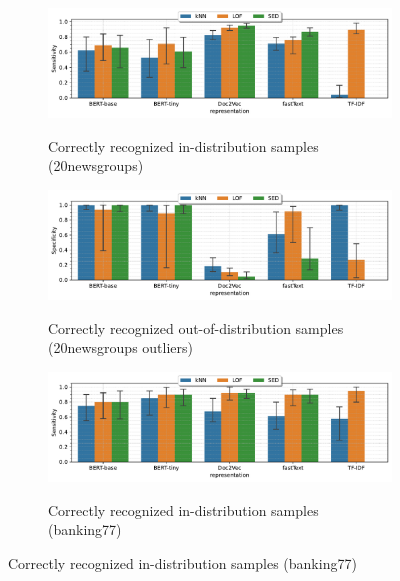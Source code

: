 \begin{figure}[t]
    \centering
    \begin{subfigure}[b]{0.9\textwidth}
        \centering
        \caption{\small Correctly recognized in-distribution samples (20newsgroups)}
        \includegraphics[width=\textwidth]{images/real-classification/barplot-20newsgroups-sens_95(representation,model)-representation_BERT-base,BERT-tiny,Doc2Vec,fastText,TF-IDF-class_0,16-data_outlier.pdf}
        \label{fig:20newsgroups-sensitivity}
    \end{subfigure}

    \vspace{-0.5em}
    \begin{subfigure}[b]{0.9\textwidth}
        \centering
        \caption{\small Correctly recognized out-of-distribution samples (20newsgroups outliers)}
        \includegraphics[width=\textwidth]{images/real-classification/barplot-20newsgroups-spec_95(representation,model)-representation_BERT-base,BERT-tiny,Doc2Vec,fastText,TF-IDF-class_0,16-data_outlier.pdf}
        \label{fig:20newsgroups-specificity}
    \end{subfigure}

    \begin{subfigure}[b]{0.9\textwidth}
        \centering
        \caption{\small Correctly recognized in-distribution samples (banking77)}
        \includegraphics[width=\textwidth]{images/real-classification/barplot-banking77-sens_95(representation,model)-representation_BERT-base,BERT-tiny,Doc2Vec,fastText,TF-IDF-class_0,61-data_outlier.pdf}
        \label{fig:banking77-sensitivity}
    \end{subfigure}


\end{figure}

